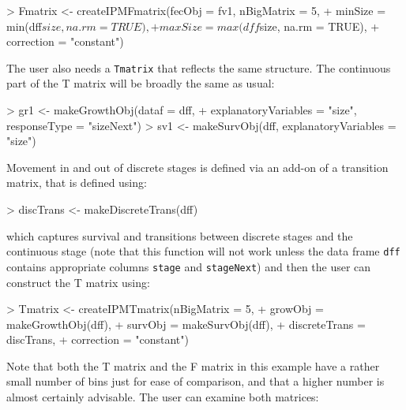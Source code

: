 \documentclass{article}
\begin{document}
\begin{Schunk}
\begin{Sinput}
> Fmatrix <- createIPMFmatrix(fecObj = fv1, nBigMatrix = 5, 
+                             minSize = min(dff$size, na.rm = TRUE), 
+                             maxSize = max(dff$size, na.rm = TRUE), 
+                             correction = "constant")
\end{Sinput}
\end{Schunk}
The user also needs a {\tt Tmatrix} that reflects the same structure. The continuous part of the T matrix will be broadly the same as usual:
\begin{Schunk}
\begin{Sinput}
> gr1 <- makeGrowthObj(dataf = dff, 
+                      explanatoryVariables = "size", responseType = "sizeNext")
> sv1 <- makeSurvObj(dff, explanatoryVariables = "size")
\end{Sinput}
\end{Schunk}
Movement in and out of discrete stages is defined via an add-on of a transition matrix, that is defined using: 
\begin{Schunk}
\begin{Sinput}
> discTrans <- makeDiscreteTrans(dff)
\end{Sinput}
\end{Schunk}
which captures survival and transitions between discrete stages and the continuous stage (note that this function will not work unless the data frame {\tt dff} contains appropriate columns {\tt stage} and {\tt stageNext}) and then the user can construct the T matrix using: 
\begin{Schunk}
\begin{Sinput}
> Tmatrix <- createIPMTmatrix(nBigMatrix = 5, 	
+                             growObj = makeGrowthObj(dff), 
+                             survObj = makeSurvObj(dff), 
+                             discreteTrans = discTrans, 
+                             correction = "constant")
\end{Sinput}
\end{Schunk}
Note that both the T matrix and the F matrix in this example have a rather small number of bins just for ease of comparison, and that a higher number is almost certainly advisable. The user can examine both matrices: 
\end{document}
